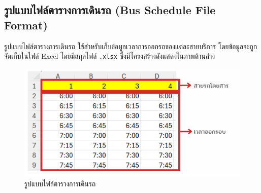   \subsection{รูปแบบไฟล์ตารางการเดินรถ (Bus Schedule File Format)}
  \begin{mypara}
      \indent รูปแบบไฟล์ตารางการเดินรถ ใช้สำหรับเก็บข้อมูลเวลาการออกรถของแต่ละสายบริการ 
      โดยข้อมูลจะถูกจัดเก็บในไฟล์ Excel โดยมีสกุลไฟล์ \texttt{.xlsx} 
      ซึ่งมีโครงสร้างดังแสดงในภาพด้านล่าง
      \begin{figure}[H]
        \centering
        \includegraphics[scale=0.5]{bus_schedule.png}
        \caption{รูปแบบไฟล์ตารางการเดินรถ}
        \label{fig:BusScheduleFileFormat}
      \end{figure}
  \end{mypara}